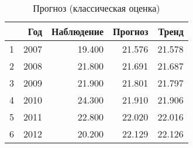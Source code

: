 \begin{table}[ht]
\centering
\begin{tabular}{rrrrr}
  \hline
 & Год & Наблюдение & Прогноз & Тренд \\ 
  \hline
1 & 2007 & 19.400 & 21.576 & 21.578 \\ 
  2 & 2008 & 21.800 & 21.691 & 21.687 \\ 
  3 & 2009 & 21.900 & 21.801 & 21.797 \\ 
  4 & 2010 & 24.300 & 21.910 & 21.906 \\ 
  5 & 2011 & 22.800 & 22.020 & 22.016 \\ 
  6 & 2012 & 20.200 & 22.129 & 22.126 \\ 
   \hline
\end{tabular}
\caption{Прогноз (классическая оценка)} 
\label{table:classical-prediction}
\end{table}
